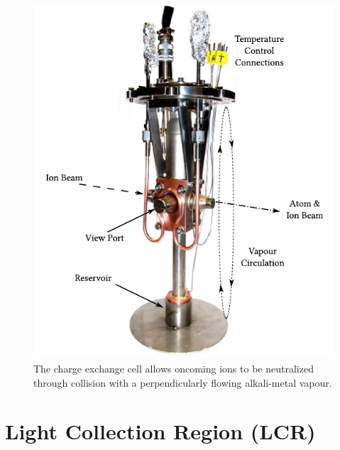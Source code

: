 \begin{figure}[h]
\begin{center}
\includegraphics[scale=0.55]{Laser_spec_triumf/CEC.png}
\end{center}
\caption[The charge exchange cell.]{\small The charge exchange cell allows oncoming ions to be neutralized through collision with a perpendicularly flowing alkali-metal vapour.\citep{CFBS}}
\label{CEC}
\end{figure}



\section{Light Collection Region (LCR)}

